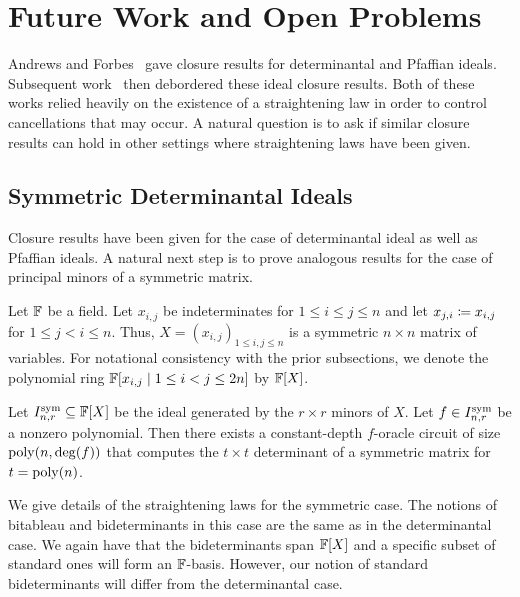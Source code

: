 \documentclass[letterpaper, 11pt]{amsart}
\newif\iffull
\begin{document}
\section{Future Work and Open Problems}

Andrews and Forbes~\cite{AF22} gave closure results for determinantal and Pfaffian ideals.
Subsequent work~\cite{DG25} then debordered these ideal closure results.
Both of these works relied heavily on the existence of a straightening law in order to control cancellations that may occur.
A natural question is to ask if similar closure results can hold in other settings where straightening laws have been given.

\subsection{Symmetric Determinantal Ideals}

Closure results have been given for the case of determinantal ideal as well as Pfaffian ideals.
A natural next step is to prove analogous results for the case of principal minors of a symmetric matrix.

Let $\mathbb{F}$ be a field.
Let $x_{i, j}$ be indeterminates for $1 \leq i \leq j \leq n$ and let $x_{j, i} \coloneqq x_{i, j}$ for $1 \leq j < i \leq n$.
Thus, $X = (x_{i, j})_{1 \leq i, j \leq n}$ is a symmetric $n \times n$ matrix of variables.
For notational consistency with the prior subsections, we denote the polynomial ring $\mathbb{F}[x_{i, j} \mid 1 \leq i < j \leq 2n]$ by $\mathbb{F}[X]$.
\begin{conj}\label{conj:sym}
  Let $I^{\operatorname{sym}}_{n, r} \subseteq \mathbb{F}[X]$ be the ideal generated by the $r \times r$ minors of $X$.
  Let $f \in I^{\operatorname{sym}}_{n, r}$ be a nonzero polynomial.
  Then there exists a constant-depth $f$-oracle circuit of size $\operatorname{poly}(n, \deg(f))$ that computes the $t \times t$ determinant of a symmetric matrix for $t = \operatorname{poly}(n)$.
\end{conj}

We give details of the straightening laws for the symmetric case.
The notions of bitableau and bideterminants in this case are the same as in the determinantal case.
We again have that the bideterminants span $\mathbb{F}[X]$ and a specific subset of standard ones will form an $\mathbb{F}$-basis.
However, our notion of standard bideterminants will differ from the determinantal case.

\iffull
\clearpage
\fi
\end{document}
